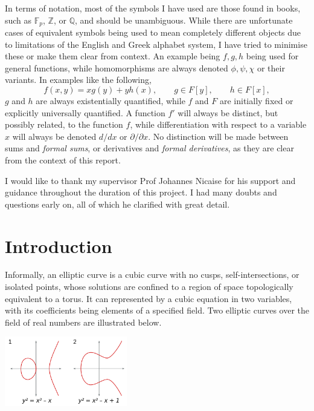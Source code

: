 \documentclass{article}
\newcommand{\F}{\mathbb{F}}
\newcommand{\Z}{\mathbb{Z}}
\newcommand{\Q}{\mathbb{Q}}
\newcommand{\rb}[1]{\left( #1 \right)}
\renewcommand{\sb}[1]{\left[ #1 \right]}
\theoremstyle{definition}
\begin{document}
In terms of notation, most of the symbols I have used are those found in books, such as $ \F_p $, $ \Z $, or $ \Q $, and should be unambiguous. While there are unfortunate cases of equivalent symbols being used to mean completely different objects due to limitations of the English and Greek alphabet system, I have tried to minimise these or make them clear from context. An example being $ f, g, h $ being used for general functions, while homomorphisms are always denoted $ \phi, \psi, \chi $ or their variants. In examples like the following,
$$ f\rb{x, y} = xg\rb{y} + yh\rb{x}, \qquad g \in F\sb{y}, \qquad h \in F\sb{x}, $$
$ g $ and $ h $ are always existentially quantified, while $ f $ and $ F $ are initially fixed or explicitly universally quantified. A function $ f' $ will always be distinct, but possibly related, to the function $ f $, while differentiation with respect to a variable $ x $ will always be denoted $ d / dx $ or $ \partial / \partial x $. No distinction will be made between sums and \emph{formal sums}, or derivatives and \emph{formal derivatives}, as they are clear from the context of this report.

I would like to thank my supervisor Prof Johannes Nicaise for his support and guidance throughout the duration of this project. I had many doubts and questions early on, all of which he clarified with great detail.

\pagebreak

\section{Introduction}

Informally, an elliptic curve is a cubic curve with no cusps, self-intersections, or isolated points, whose solutions are confined to a region of space topologically equivalent to a torus. It can represented by a cubic equation in two variables, with its coefficients being elements of a specified field. Two elliptic curves over the field of real numbers are illustrated below.

\begin{center}
\includegraphics*[width=0.4\textwidth]{ECClines-3.png}
\end{center}
\end{document}
